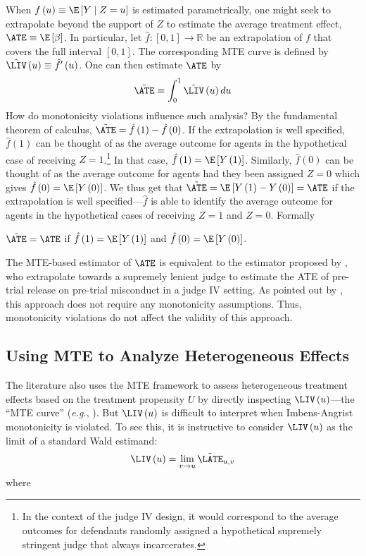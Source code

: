 When $f\left(u\right)\equiv\E\left[Y\mid Z=u\right]$ is estimated
parametrically, one might seek to extrapolate beyond the support of
$Z$ to estimate the average treatment effect, $\ATE\equiv\E\left[\beta\right]$.
In particular, let $\hat{f}:\left[0,1\right]\rightarrow\mathbb{R}$
be an extrapolation of $f$ that covers the full interval $\left[0,1\right]$.
The corresponding MTE curve is defined by $\hat{\LIV}\left(u\right)\equiv\hat{f}'\left(u\right)$.
One can then estimate $\ATE$ by
\[
\tilde{\ATE}\equiv\int_{0}^{1}\hat{\LIV}\left(u\right)du
\]
How do monotonicity violations influence such analysis? By the fundamental
theorem of calculus, $\tilde{\ATE}=\hat{f}\left(1\right)-\hat{f}\left(0\right)$.
If the extrapolation is well specified, $\hat{f}\left(1\right)$ can
be thought of as the average outcome for agents in the hypothetical
case of receiving $Z=1$.\footnote{In the context of the judge IV design, it would correspond to the
average outcomes for defendants randomly assigned a hypothetical supremely
stringent judge that always incarcerates.} In that case, $\hat{f}\left(1\right)=\E\left[Y\left(1\right)\right]$.
Similarly, $\hat{f}\left(0\right)$ can be thought of as the average
outcome for agents had they been assigned $Z=0$ which gives $\hat{f}\left(0\right)=\E\left[Y\left(0\right)\right]$.
We thus get that $\tilde{\ATE}=\E\left[Y\left(1\right)-Y\left(0\right)\right]=\ATE$
if the extrapolation is well specified---$\hat{f}$ is able to identify
the average outcome for agents in the hypothetical cases of receiving
$Z=1$ and $Z=0$. Formally
\begin{prop}
$\tilde{\ATE}=\ATE$ if $\hat{f}\left(1\right)=\E\left[Y\left(1\right)\right]$
and $\hat{f}\left(0\right)=\E\left[Y\left(0\right)\right]$.
\end{prop}
The MTE-based estimator of $\ATE$ is equivalent to the estimator
proposed by \citet{arnold2021measuring}, who extrapolate towards
a supremely lenient judge to estimate the ATE of pre-trial release
on pre-trial misconduct in a judge IV setting. As pointed out by \citet{arnold2021measuring},
this approach does not require any monotonicity assumptions. Thus,
monotonicity violations do not affect the validity of this approach.

\subsection{Using MTE to Analyze Heterogeneous Effects}

The literature also uses the MTE framework to assess heterogeneous
treatment effects based on the treatment propensity $U$ by directly
inspecting $\LIV\left(u\right)$---the ``MTE curve'' (\emph{e.g.},
\citealt{doyle2007child,maestas2013does,french2014effect}). But $\LIV\left(u\right)$
is difficult to interpret when Imbens-Angrist monotonicity is violated.
To see this, it is instructive to consider $\LIV\left(u\right)$ as
the limit of a standard Wald estimand:
\[
\LIV\left(u\right)=\lim_{v\rightarrow u}\tilde{\LATE}_{u,v}
\]
where

